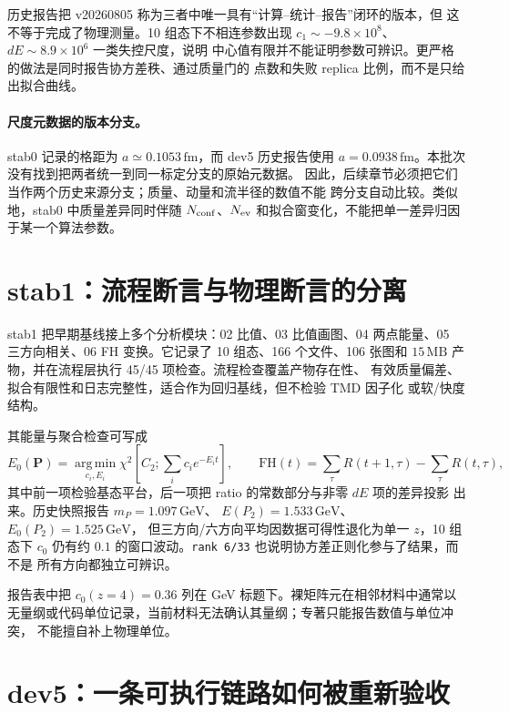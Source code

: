 历史报告把 v20260805 称为三者中唯一具有“计算--统计--报告”闭环的版本，但
这不等于完成了物理测量。10 组态下不相连参数出现
\(c_1\sim-9.8\times10^8\)、\(dE\sim8.9\times10^6\) 一类失控尺度，说明
中心值有限并不能证明参数可辨识。更严格的做法是同时报告协方差秩、通过质量门的
点数和失败 replica 比例，而不是只给出拟合曲线。

\paragraph{尺度元数据的版本分支。}
stab0 记录的格距为 \(a\simeq0.1053\,\mathrm{fm}\)，而 dev5 历史报告使用
\(a=0.0938\,\mathrm{fm}\)。本批次没有找到把两者统一到同一标定分支的原始元数据。
因此，后续章节必须把它们当作两个历史来源分支；质量、动量和流半径的数值不能
跨分支自动比较。类似地，stab0 中质量差异同时伴随 \(N_{\rm conf}\)、\(N_{\rm ev}\)
和拟合窗变化，不能把单一差异归因于某一个算法参数。

\section{stab1：流程断言与物理断言的分离}

stab1 把早期基线接上多个分析模块：02 比值、03 比值画图、04 两点能量、05
三方向相关、06 FH 变换。它记录了 10 组态、166 个文件、106 张图和
\(15\,\mathrm{MB}\) 产物，并在流程层执行 45/45 项检查。流程检查覆盖产物存在性、
有效质量偏差、拟合有限性和日志完整性，适合作为回归基线，但不检验 TMD 因子化
或软/快度结构。

其能量与聚合检查可写成
\begin{equation}
  E_0(\mathbf P)=\operatorname*{arg\,min}_{c_i,E_i}
  \chi^2\!\left[C_2;\sum_i c_i e^{-E_i t}\right],
  \qquad
  \mathrm{FH}(t)=\sum_\tau R(t+1,\tau)-\sum_\tau R(t,\tau),
  \label{eq:b08-energy-fh}
\end{equation}
其中前一项检验基态平台，后一项把 ratio 的常数部分与非零 \(dE\) 项的差异投影
出来。历史快照报告 \(m_P=1.097\,\mathrm{GeV}\)、
\(E(P_2)=1.533\,\mathrm{GeV}\)、\(E_0(P_2)=1.525\,\mathrm{GeV}\)，
但三方向/六方向平均因数据可得性退化为单一 \(z\)，10 组态下 \(c_0\)
仍有约 \(0.1\) 的窗口波动。\texttt{rank 6/33} 也说明协方差正则化参与了结果，而不是
所有方向都独立可辨识。

报告表中把 \(c_0(z=4)=0.36\) 列在 GeV 标题下。裸矩阵元在相邻材料中通常以
无量纲或代码单位记录，当前材料无法确认其量纲；专著只能报告数值与单位冲突，
不能擅自补上物理单位。

\section{dev5：一条可执行链路如何被重新验收}
\label{sec:b08-dev5}

